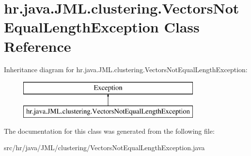 \hypertarget{classhr_1_1java_1_1_j_m_l_1_1clustering_1_1_vectors_not_equal_length_exception}{\section{hr.\+java.\+J\+M\+L.\+clustering.\+Vectors\+Not\+Equal\+Length\+Exception Class Reference}
\label{classhr_1_1java_1_1_j_m_l_1_1clustering_1_1_vectors_not_equal_length_exception}
}
Inheritance diagram for hr.\+java.\+J\+M\+L.\+clustering.\+Vectors\+Not\+Equal\+Length\+Exception\+:\begin{figure}[H]
\begin{center}
\leavevmode
\includegraphics[height=2.000000cm]{classhr_1_1java_1_1_j_m_l_1_1clustering_1_1_vectors_not_equal_length_exception}
\end{center}
\end{figure}


The documentation for this class was generated from the following file\+:\begin{DoxyCompactItemize}
\item 
src/hr/java/\+J\+M\+L/clustering/Vectors\+Not\+Equal\+Length\+Exception.\+java\end{DoxyCompactItemize}
